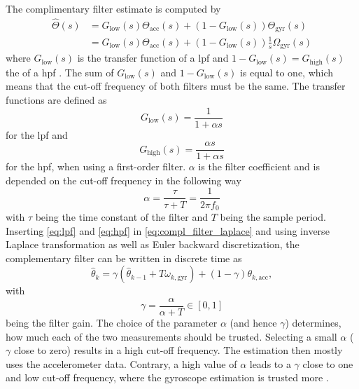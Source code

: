The complimentary filter estimate is computed by
\begin{align}
	\label{eq:compl_filter_laplace}
	\hat{\Theta}(s) & = G_\mathrm{low}(s)\Theta_\mathrm{acc}(s) + (1 - G_\mathrm{low}(s))\Theta_\mathrm{gyr}(s) \nonumber   \\
	                & = G_\mathrm{low}(s)\Theta_\mathrm{acc}(s) + (1 - G_\mathrm{low}(s))\frac{1}{s}\Omega_\mathrm{gyr} (s)
\end{align}
where $G_\mathrm{low}(s)$ is the transfer function of a \gls{lpf} and $1-G_\mathrm{low}(s) = G_\mathrm{high}(s)$ the of a \gls{hpf} \cite{Kok2017}.
The sum of $G_\mathrm{low}(s)$ and $1-G_\mathrm{low}(s)$ is equal to one, which means that the cut-off frequency of both filters must be the same.
The transfer functions are defined as
\begin{equation}
	\label{eq:lpf}
	G_\mathrm{low} (s) = \frac{1}{1 + \alpha s}
\end{equation}
for the \gls{lpf} and
\begin{equation}
	\label{eq:hpf}
	G_\mathrm{high} (s) = \frac{\alpha s}{1 + \alpha s}
\end{equation}
for the \gls{hpf}, when using a first-order filter.
$\alpha$ is the filter coefficient and is depended on the cut-off frequency in the following way
\begin{equation}
	\alpha
	= \frac{\tau}{\tau + T}
	= \frac{1}{2\pi f_0}
	\label{eq:filter_f0}
\end{equation}
with $\tau$ being the time constant of the filter and $T$ being the sample period.
Inserting \cref{eq:lpf} and \cref{eq:hpf} in \cref{eq:compl_filter_laplace} and using inverse Laplace transformation as well as Euler backward discretization, the complementary filter can be written in discrete time as
\begin{equation}
	\hat{\theta}_k = \gamma\left(\hat{\theta}_{k - 1} + T \omega_{k, \mathrm{gyr}}\right) + (1 - \gamma) \theta_{k, \mathrm{acc}},
\end{equation}
with
\begin{equation}
	\label{eq:filter_gain}
	\gamma = \frac{\alpha}{\alpha + T} \in [0,1]
\end{equation}
being the filter gain.
The choice of the parameter $\alpha$ (and hence $\gamma$) determines, how much each of the two measurements should be trusted.
Selecting a small $\alpha$ ($\gamma$ close to zero) results in a high cut-off frequency.
The estimation then mostly uses the accelerometer data.
Contrary, a high value of $\alpha$ leads to a $\gamma$ close to one and low cut-off frequency, where the gyroscope estimation is trusted more \cite{1997Baerveldt}.\\
